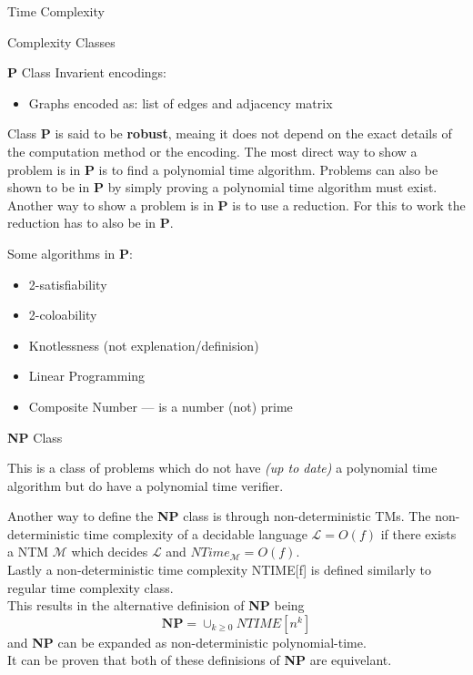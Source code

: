 \documentclass[12pt, letterpaper]{article}
\begin{document}
\begin{section}{Time Complexity}
\begin{subsection}{Complexity Classes}
\begin{subsubsection}{\textbf{P} Class}
      Invarient encodings:
      \begin{itemize}
        \item Graphs encoded as: list of edges and adjacency matrix
      \end{itemize}

      Class \textbf{P} is said to be \textbf{robust}, meaing it does not
      depend on the exact details of the computation method or the encoding.
      The most direct way to show a problem is in \textbf{P} is to find
      a polynomial time algorithm. Problems can also be shown to be in \textbf{P}
      by simply proving a polynomial time algorithm must exist.
      Another way to show a problem is in \textbf{P} is to use a reduction.
      For this to work the reduction has to also be in \textbf{P}.

      Some algorithms in \textbf{P}:
      \begin{itemize}
        \item 2-satisfiability
        \item 2-coloability
        \item Knotlessness (not explenation/definision)
        \item Linear Programming
        \item Composite Number --- is a number (not) prime
      \end{itemize}

    \end{subsubsection}

    \begin{subsubsection}{\textbf{NP} Class}

      This is a class of problems which do not have \textit{(up to date)}
      a polynomial time algorithm but do have a polynomial time verifier.

      Another way to define the \textbf{NP} class is through
      non-deterministic TMs. The non-deterministic time complexity
      of a decidable language \(\mathscr{L} = O(f)\) if there exists a NTM
      \(\mathscr{M}\) which decides \(\mathscr{L}\) and \(NTime_{\mathscr{M}} = O(f)\). \\
      Lastly a non-deterministic time complexity NTIME[f] is defined similarly to
      regular time complexity class. \\
      This results in the alternative definision of \textbf{NP} being
      \[\textbf{NP} = \cup_{k \geq 0} NTIME[n^{k}]\]
      and \textbf{NP} can be expanded as non-deterministic polynomial-time. \\
      It can be proven that both of these definisions of \textbf{NP} are equivelant.


\end{subsubsection}
\end{subsection}
\end{section}
\end{document}
